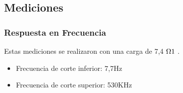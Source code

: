 \subsection{Mediciones}
\bigskip
\subsubsection{Respuesta en Frecuencia}
Estas mediciones se realizaron con una carga de 7,4 $\ohm1$ .
\begin{itemize}
\item Frecuencia de corte inferior: 7,7Hz
\item Frecuencia de corte superior: 530KHz
\end{itemize}


